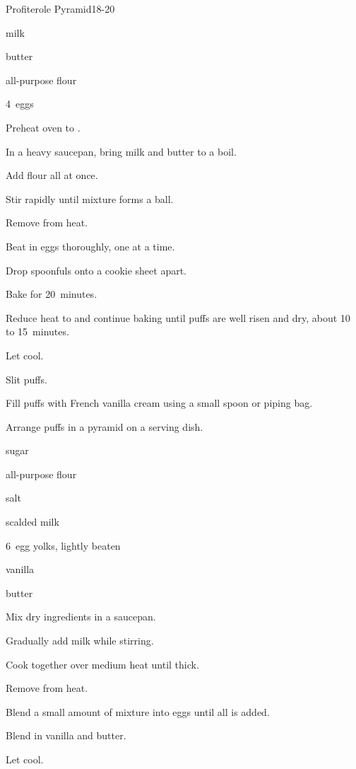 \begin{recipe}{Profiterole Pyramid}{}{18-20}

\begin{ingredients}
\item {} milk
\item \C{\half} butter
\item {} all-purpose flour
\item 4~eggs
\end{ingredients}

\begin{directions}
\item Preheat oven to .
\item In a heavy saucepan, bring milk and butter to a boil.
\item Add flour all at once.
\item Stir rapidly until mixture forms a ball.
\item Remove from heat.
\item Beat in eggs thoroughly, one at a time.
\item Drop spoonfuls onto a cookie sheet  apart.
\item Bake for 20~minutes.
\item Reduce heat to  and continue baking until puffs are well risen and dry, about 10 to 15~minutes.
\item Let cool.
\item Slit puffs.
\item Fill puffs with French vanilla cream using a small spoon or piping bag.
\item Arrange puffs in a pyramid on a serving dish.
\end{directions}

\begin{ingredients}
\item \C{\twothird} sugar
\item \C{\half} all-purpose flour
\item \tp{\half} salt
\item {} scalded milk
\item 6~egg yolks, lightly beaten
\item {} vanilla
\item {} butter
\end{ingredients}

\begin{directions}
\item Mix dry ingredients in a saucepan.
\item Gradually add milk while stirring.
\item Cook together over medium heat until thick.
\item Remove from heat.
\item Blend a small amount of mixture into eggs until all is added.
\item Blend in vanilla and butter.
\item Let cool.
\end{directions}
\end{recipe}
